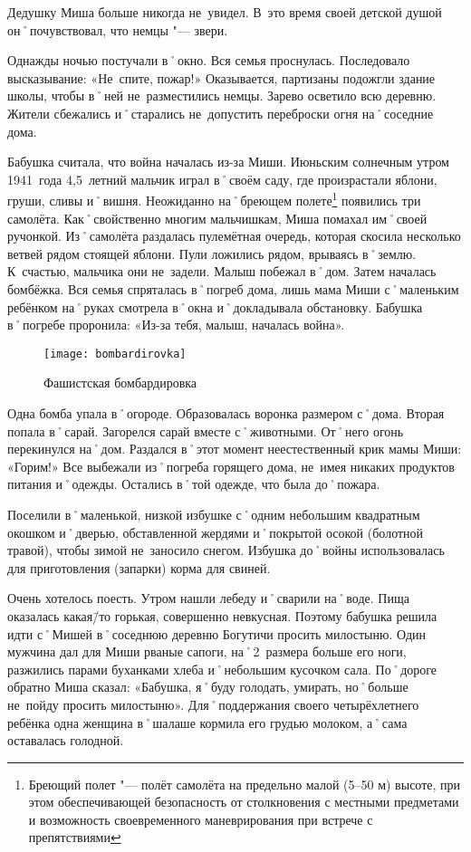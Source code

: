 Дедушку Миша больше никогда не~увидел. В~это время своей детской душой он˚почувствовал, что немцы "--- звери.

Однажды ночью постучали в˚окно. Вся семья проснулась. Последовало высказывание: «Не~спите, пожар!» Оказывается, партизаны подожгли здание школы, чтобы в˚ней не~разместились немцы. Зарево осветило всю деревню. Жители сбежались и˚старались не~допустить переброски огня на˚соседние дома.

Бабушка считала, что война началась из-за Миши. Июньским солнечным утром 1941~года 4,5~летний мальчик играл в˚своём саду, где произрастали яблони, груши, сливы и˚вишня. Неожиданно на˚бреющем полете\footnote{Бреющий полет "--- полёт самолёта на предельно малой (5–50 м) высоте, при этом обеспечивающей безопасность от столкновения с местными предметами и возможность своевременного маневрирования при встрече с препятствиями} появились три самолёта. Как˚свойственно многим мальчишкам, Миша помахал им˚своей ручонкой. Из˚самолёта раздалась пулемётная очередь, которая скосила несколько ветвей рядом стоящей яблони. Пули ложились рядом, врываясь в˚землю. К~счастью, мальчика они не~задели. Малыш побежал в˚дом. Затем началась бомбёжка. Вся семья спряталась в˚погреб дома, лишь мама Миши с˚маленьким ребёнком на˚руках смотрела в˚окна и˚докладывала обстановку. Бабушка в˚погребе проронила: «Из-за тебя, малыш, началась война».

\begin{wrapfigure}{O}{.4\textwidth}
\centering
\texttt{[image: bombardirovka]}
\caption{Фашистская бомбардировка}
\label{fig:bombardirovka}
\end{wrapfigure}

Одна бомба упала в˚огороде. Образовалась воронка размером с˚дома. Вторая попала в˚сарай. Загорелся сарай вместе с˚животными. От˚него огонь перекинулся на˚дом. Раздался в˚этот момент неестественный крик мамы Миши: «Горим!» Все выбежали из˚погреба горящего дома, не~имея никаких продуктов питания и˚одежды. Остались в˚той одежде, что была до˚пожара.

Поселили в˚маленькой, низкой избушке с˚одним небольшим квадратным окошком и˚дверью, обставленной жердями и˚покрытой осокой (болотной травой), чтобы зимой не~заносило снегом. Избушка до˚войны использовалась для приготовления (запарки) корма для свиней.

Очень хотелось поесть. Утром нашли лебеду и˚сварили на˚воде. Пища оказалась какая\=/то горькая, совершенно невкусная. Поэтому бабушка решила идти с˚Мишей в˚соседнюю деревню Богутичи просить милостыню. Один мужчина дал для Миши рваные сапоги, на˚2~размера больше его ноги, разжились парами буханками хлеба и˚небольшим кусочком сала. По˚дороге обратно Миша сказал: «Бабушка, я˚буду голодать, умирать, но˚больше не~пойду просить милостыню». Для˚поддержания своего четырёхлетнего ребёнка одна женщина в˚шалаше кормила его грудью молоком, а˚сама оставалась голодной.

